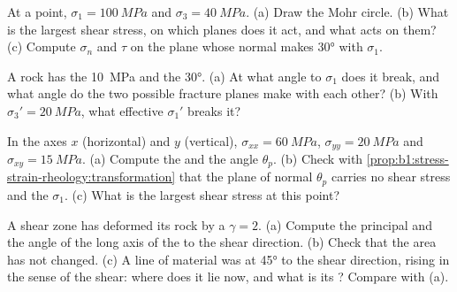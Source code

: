 \begin{exercise}[$\star$]\label{exo:b1:stress-strain-rheology:3}
At a point, $\sigma_1 = \qty{100}{MPa}$ and $\sigma_3 = \qty{40}{MPa}$.
(a) Draw the Mohr circle. (b) What is the largest shear stress, on which
planes does it act, and what  acts on them? (c) Compute $\sigma_n$
and $\tau$ on the plane whose normal makes \ang{30} with $\sigma_1$.
\end{exercise}

\begin{exercise}[$\star$]\label{exo:b1:stress-strain-rheology:4}
A rock has the  \qty{10}{MPa} and the 
\ang{30}. (a) At what angle to $\sigma_1$ does it break, and what angle do the
two possible fracture planes make with each other? (b) With
$\sigma_3' = \qty{20}{MPa}$, what effective $\sigma_1'$ breaks it?
\end{exercise}

\begin{exercise}[$\star\star$]\label{exo:b1:stress-strain-rheology:5}
In the axes $x$ (horizontal) and $y$ (vertical), $\sigma_{xx} = \qty{60}{MPa}$,
$\sigma_{yy} = \qty{20}{MPa}$ and $\sigma_{xy} = \qty{15}{MPa}$. (a) Compute the
 and the angle $\theta_p$. (b) Check with
\cref{prop:b1:stress-strain-rheology:transformation} that the plane of normal
$\theta_p$ carries no shear stress and the  $\sigma_1$. (c) What is
the largest shear stress at this point?
\end{exercise}

\begin{exercise}[$\star\star$]\label{exo:b1:stress-strain-rheology:6}
A shear zone has deformed its rock by a  $\gamma = 2$. (a) Compute
the principal  and the angle of the long axis of the 
to the shear direction. (b) Check that the area has not changed. (c) A line of
material was at \ang{45} to the shear direction, rising in the sense of the
shear: where does it lie now, and what is its ? Compare with (a).
\end{exercise}

